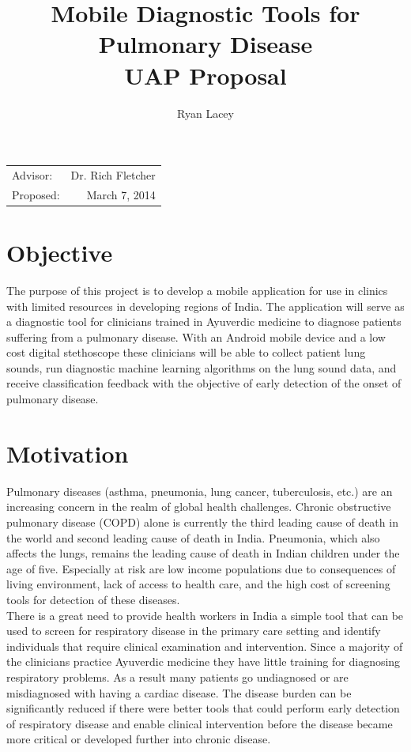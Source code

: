 \documentclass{article}
\title{Mobile Diagnostic Tools for Pulmonary Disease\\ UAP Proposal} %
\author{Ryan Lacey}
\date{}
\begin{document}
\maketitle %

\begin{center}
\begin{tabular}{l r}
Advisor: & Dr. Rich Fletcher \\
Proposed: & March 7, 2014 \\
\end{tabular}
\end{center}

\section{Objective}

The purpose of this project is to develop a mobile application for use in clinics with limited resources in developing regions of India. The application will serve as a diagnostic tool for clinicians trained in Ayuverdic medicine to diagnose patients suffering from a pulmonary disease. With an Android mobile device and a low cost digital stethoscope these clinicians will be able to collect patient lung sounds, run diagnostic machine learning algorithms on the lung sound data, and receive classification feedback with the objective of early detection of the onset of pulmonary disease.\\

\section{Motivation}

Pulmonary diseases (asthma, pneumonia, lung cancer, tuberculosis, etc.) are an increasing concern in the realm of global health challenges. Chronic obstructive pulmonary disease (COPD) alone is currently the third leading cause of death in the world and second leading cause of death in India. Pneumonia, which also affects the lungs, remains the leading cause of death in Indian children under the age of five. Especially at risk are low income populations due to consequences of living environment, lack of access to health care, and the high cost of screening tools for detection of these diseases.\\

There is a great need to provide health workers in India a simple tool that can be used to screen for respiratory disease in the primary care setting and identify individuals that require clinical examination and intervention. Since a majority of the clinicians practice Ayuverdic medicine they have little training for diagnosing respiratory problems. As a result many patients go undiagnosed or are misdiagnosed with having a cardiac disease. The disease burden can be significantly reduced if there were better tools that could perform early detection of respiratory disease and enable clinical intervention before the disease became more critical or developed further into chronic disease.\\
\end{document}
